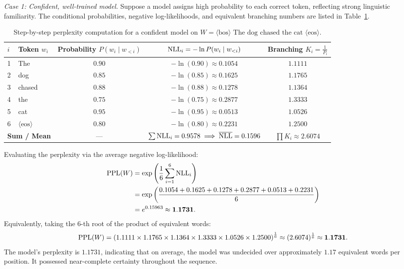 \documentclass[../../../main.tex]{subfiles}
\begin{document}
\textit{Case 1: Confident, well-trained model.}
Suppose a model assigns high probability to each correct token, reflecting strong linguistic familiarity. The conditional probabilities, negative log-likelihoods, and equivalent branching numbers are listed in Table~\ref{tab:perplexity_confident_example}.

\begin{table}[htbp]
\centering
\small
\caption{Step-by-step perplexity computation for a confident model on $W = \langle\text{bos}\rangle \text{ The dog chased the cat } \langle\text{eos}\rangle$.}
\label{tab:perplexity_confident_example}
\begin{tabular}{llccc}
\toprule
$i$ & Token $w_i$ & Probability $P(w_i \mid w_{<i})$ & $\mathrm{NLL}_i = -\ln P(w_i \mid w_{<i})$ & Branching $K_i = \frac{1}{P_i}$ \\
\midrule
1 & The & $0.90$ & $-\ln(0.90) \approx 0.1054$ & $1.1111$ \\
2 & dog & $0.85$ & $-\ln(0.85) \approx 0.1625$ & $1.1765$ \\
3 & chased & $0.88$ & $-\ln(0.88) \approx 0.1278$ & $1.1364$ \\
4 & the & $0.75$ & $-\ln(0.75) \approx 0.2877$ & $1.3333$ \\
5 & cat & $0.95$ & $-\ln(0.95) \approx 0.0513$ & $1.0526$ \\
6 & $\langle\text{eos}\rangle$ & $0.80$ & $-\ln(0.80) \approx 0.2231$ & $1.2500$ \\
\midrule
\multicolumn{2}{l}{\textbf{Sum / Mean}} & --- & $\sum \mathrm{NLL}_i = 0.9578 \implies \overline{\mathrm{NLL}} = 0.1596$ & $\prod K_i \approx 2.6074$ \\
\bottomrule
\end{tabular}
\end{table}

Evaluating the perplexity via the average negative log-likelihood:
\begin{align}
\mathrm{PPL}(W) &= \exp\left( \frac{1}{6} \sum_{i=1}^6 \mathrm{NLL}_i \right) \nonumber \\
        &= \exp\left( \frac{0.1054 + 0.1625 + 0.1278 + 0.2877 + 0.0513 + 0.2231}{6} \right) \nonumber \\
        &= e^{0.15963} \approx \mathbf{1.1731}.
\end{align}
Equivalently, taking the 6-th root of the product of equivalent words:
\begin{equation}
\mathrm{PPL}(W) = \left( 1.1111 \times 1.1765 \times 1.1364 \times 1.3333 \times 1.0526 \times 1.2500 \right)^{\frac{1}{6}} \approx (2.6074)^{\frac{1}{6}} \approx \mathbf{1.1731}.
\end{equation}
The model's perplexity is $1.1731$, indicating that on average, the model was undecided over approximately $1.17$ equivalent words per position. It possessed near-complete certainty throughout the sequence.
\end{document}
